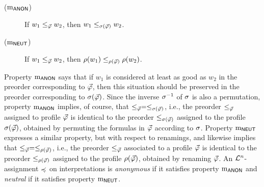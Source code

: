 \begin{description}
	\item[($\oom{\ANON}$)] If $w_1 \le_{\P} w_2$, then $w_1 \le_{\perm(\P)} w_2$.	
	\item[($\oom{\NEUT}$)] If $w_1 \le_{\P} w_2$, then $\rnm(w_1) \le_{\rnm(\P)} \rnm(w_2)$.
\end{description}

Property $\oom{\ANON}$ says that if $w_1$ is considered at least as good as $w_2$ 
in the preorder corresponding to $\P$, then this situation should be preserved in the 
preorder corresponding to $\perm(\P)$.
Since the inverse $\perm^{-1}$ of $\perm$ is also a permutation,
property $\oom{\ANON}$ implies, of course, that 
$\le_{\P}=\le_{\perm(\P)}$,
i.e., the preorder $\le_{\P}$ assigned to profile $\P$ 
is identical to the preorder $\le_{\perm(\P)}$ assigned to 
the profile $\perm(\P)$, obtained by permuting the formulas in $\P$ according to $\perm$.
Property $\oom{\NEUT}$ expresses a similar property, but with 
respect to renamings, and likewise implies that $\le_{\P} = \le_{\rnm(\P)}$,
i.e., the preorder $\le_{\P}$ associated to a profile $\P$ 
is identical to the preorder $\le_{\rnm(\P)}$ assigned to the profile $\rnm(\P)$,
obtained by renaming $\P$.
An $\L^n$-assignment $\as$ on interpretations 
is \emph{anonymous} if it satisfies property $\oom{\ANON}$
and \emph{neutral} if it satisfies property $\oom{\NEUT}$.



	
